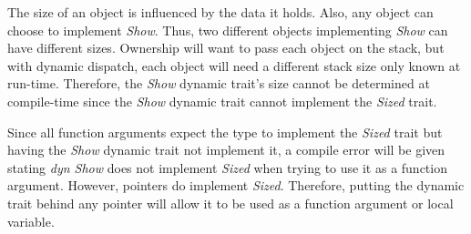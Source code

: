 The size of an object is influenced by the data it holds.
Also, any object can choose to implement \textit{Show}.
Thus, two different objects implementing \textit{Show} can have different sizes.
Ownership will want to pass each object on the stack, but with dynamic dispatch, each object will need a different stack size only known at run-time.
Therefore, the \textit{Show} dynamic trait's size cannot be determined at compile-time since the \textit{Show} dynamic trait cannot implement the \textit{Sized} trait.

Since all function arguments expect the type to implement the \textit{Sized} trait but having the \textit{Show} dynamic trait not implement it, a compile error will be given stating \textit{dyn Show} does not implement \textit{Sized} when trying to use it as a function argument.
However, pointers do implement \textit{Sized}.
Therefore, putting the dynamic trait behind any pointer will allow it to be used as a function argument or local variable.


